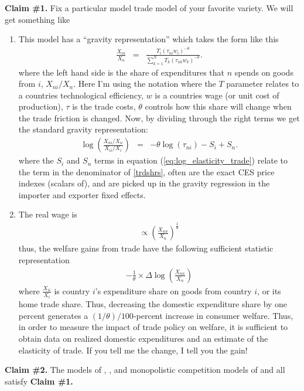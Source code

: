 \documentclass[pdftex,12pt]{article}
\begin{document}
\textbf{Claim \#1.} Fix a particular model trade model of your favorite variety. We will get something like
\begin{enumerate}
\item This model has a ``gravity representation'' which takes the form like this
\begin{eqnarray}
\displaystyle \label{trdshrs} \frac{X_{ni}}{X_n}&=&\frac{T_i(\tau_{ni}w_i)^{-\theta}}{\sum_{k=1}^NT_k(\tau_{nk}w_k)^{-\theta}}.
\end{eqnarray}
where the left hand side is the share of expenditures that $n$ spends on goods from $i$, $X_{ni}/X_n$. Here I'm using the \citet{eaton2002technology} notation where the $T$ parameter relates to a countries technological efficiency, $w$ is a countries wage (or unit cost of production), $\tau$ is the trade costs, $\theta$ controls how this share will change when the trade friction is changed. Now, by dividing through the right terms we get the standard gravity representation:
\begin{eqnarray}
\displaystyle \log\left(\frac{X_{ni}/X_n}{X_{ii}/X_i}\right)&=&-\theta \log\left(\tau_{ni}\right) -  S_i +  S_n.
\label{eq:log_elasticity_trade}
\end{eqnarray}
where the $S_i$ and $S_n$ terms in equation (\ref{eq:log_elasticity_trade}) relate to the term in the denominator of \ref{trdshrs}, often are the exact CES price indexes (scalars of), and are picked up in the gravity regression in the importer and exporter fixed effects.

\item The real wage is
\begin{eqnarray}
\propto \left(\frac{X_{nn}}{X_{n}}\right)^{\frac{1}{\theta}}
\end{eqnarray}
thus, the welfare gains from trade have the following sufficient statistic representation
\begin{eqnarray}
-\frac{1}{\theta} \times \Delta \log\left(\frac{X_{nn}}{X_n}\right)
\label{eq:welfare_gains}
\end{eqnarray}
where $\frac{X_{ii}}{X_i}$ is country $i$'s expenditure share on goods from country $i$, or its home trade share. Thus, decreasing the domestic expenditure share by one percent generates a $(1/\theta)/100$-percent increase in consumer welfare. Thus, in order to measure the impact of trade policy on welfare, it is sufficient to obtain data on realized domestic expenditures and an estimate of the elasticity of trade. If you tell me the change, I tell you the gain!
\end{enumerate}
\medskip
\textbf{Claim \#2.} The models of \citet{and79}, \citet{eaton2002technology}, \citet{bejk03} and monopolistic competition models of \citet{krug80} and \citet{mel03} all satisfy \textbf{Claim \#1.}
\end{document}
